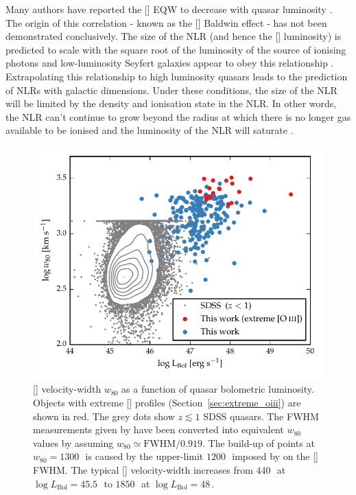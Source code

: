 Many authors have reported the [] EQW to decrease with quasar luminosity \citep[e.g.][]{brotherton96,sulentic04,baskin05b,zhang11,stern12}.
The origin of this correlation - known as the [] Baldwin effect \citep[e.g.][]{baldwin77} - has not been demonstrated conclusively. 
The size of the NLR (and hence the [] luminosity) is predicted to scale with the square root of the luminosity of the source of ionising photons \citep[e.g.][]{netzer90} and low-luminosity Seyfert galaxies appear to obey this relationship \citep[e.g.][]{bennert02}. 
Extrapolating this relationship to high luminosity quasars leads to the prediction of NLRs with galactic dimensions.
Under these conditions, the size of the NLR will be limited by the density and ionisation state in the NLR. 
In other words, the NLR can't continue to grow beyond the radius at which there is no longer gas available to be ionised and the luminosity of the NLR will saturate \citep[e.g.][]{hainline13,hainline14}. 

\begin{figure}[t!]
    \centering
    \includegraphics[width=\columnwidth]{figures/chapter04/lum_w80.pdf} 
    \caption[{[] velocity-width $w_{80}$ as a function of quasar bolometric luminosity.}]{[] velocity-width $w_{80}$ as a function of quasar bolometric luminosity. Objects with extreme [] profiles (Section~\ref{sec:extreme_oiii}) are shown in red. The grey dots show $z\lesssim1$ SDSS quasars. The FWHM measurements given by \citet{shen11} have been converted into equivalent $w_{80}$ values by assuming $w_{80} \simeq \text{FWHM} / 0.919$. The build-up of points at $w_{80}=1300$\,\kms\, is caused by the upper-limit $1200$\,\kms\, imposed by \citet{shen11} on the [] FWHM. The typical [] velocity-width increases from $440$\,\kms\, at $\log L_{\text{Bol}}=45.5$\,\ergs\, to $1850$\,\kms\, at $\log L_{\text{Bol}}=48$\,\ergs. } 
    \label{fig:lum_w80}
\end{figure}

